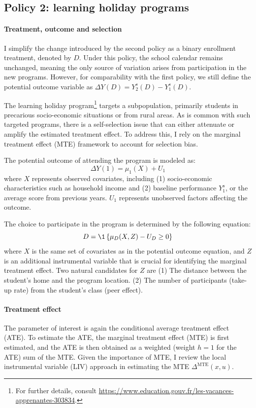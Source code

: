 \documentclass[12pt]{article}
\begin{document}
\subsection{Policy 2: learning holiday programs}
\paragraph{Treatment, outcome and selection}
I simplify the change introduced by the second policy as a binary enrollment
treatment, denoted by $D$. Under this policy, the school calendar remains
unchanged, meaning the only source of variation arises from participation in
the new programs. However, for comparability with the first policy, we still
define the potential outcome variable as $\Delta Y(D) = Y^s_2(D) - Y^s_1(D)$.

The learning holiday program\footnote{For further details, consult
    \url{https://www.education.gouv.fr/les-vacances-apprenantes-303834}.} targets a
subpopulation, primarily students in precarious socio-economic situations or
from rural areas. As is common with such targeted programs, there is a
self-selection issue that can either attenuate or amplify the estimated
treatment effect. To address this, I rely on the marginal treatment effect
(MTE) framework \citep{heckman2005structural} to account for selection bias.

The potential outcome of attending the program is modeled as:
\begin{equation*}
    \Delta Y(1)=\mu_1(X)+U_1
\end{equation*} where $X$ represents observed covariates, including (1)
socio-economic characteristics such as household income and (2) baseline performance $Y^s_1$, or the average score from previous
years. $U_1$ represents unobserved factors affecting the outcome.

The choice to participate in the program is determined by the following
equation:
\begin{equation*}
    D=\1\set{\mu_D(X,Z)-U_D\ge 0 }
\end{equation*}
where $X$ is the same set of covariates as in the potential outcome equation, and $Z$ is an additional instrumental variable that is crucial for identifying the marginal treatment effect. Two natural candidates for $Z$ are (1) The distance between the student's home and the program location.
(2) The number of participants (take-up rate) from the student's class (peer effect).

\paragraph{Treatment effect}
The parameter of interest is again the conditional average treatment effect
(ATE). To estimate the ATE, the marginal treatment effect (MTE) is first
estimated, and the ATE is then obtained as a weighted (weight $h = 1$ for the
ATE) sum of the MTE. Given the importance of MTE, I review the local
instrumental variable (LIV) approach in estimating the MTE $\Delta^{\text{MTE}}
    (x,u)$.
\end{document}
